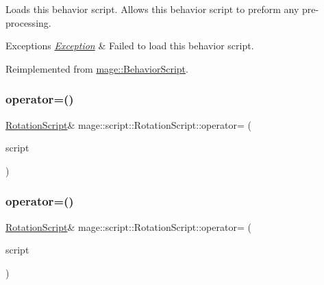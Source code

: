 Loads this behavior script. Allows this behavior script to preform any pre-\/processing.


\begin{DoxyExceptions}{Exceptions}
{\em \hyperlink{classmage_1_1_exception}{Exception}} & Failed to load this behavior script. \\
\hline
\end{DoxyExceptions}


Reimplemented from \hyperlink{classmage_1_1_behavior_script_a06521eef472f2d878a9f652b95b723a8}{mage\+::\+Behavior\+Script}.

\hypertarget{classmage_1_1script_1_1_rotation_script_afa4e9fcddf4f20f6c471dfd5fed1610f}{}\label{classmage_1_1script_1_1_rotation_script_afa4e9fcddf4f20f6c471dfd5fed1610f} 
\subsubsection{\texorpdfstring{operator=()}{operator=()}\hspace{0.1cm}{\footnotesize\ttfamily [1/2]}}
{\footnotesize\ttfamily \hyperlink{classmage_1_1script_1_1_rotation_script}{Rotation\+Script}\& mage\+::script\+::\+Rotation\+Script\+::operator= (\begin{DoxyParamCaption}\item[{const \hyperlink{classmage_1_1script_1_1_rotation_script}{Rotation\+Script} \&}]{script }\end{DoxyParamCaption})\hspace{0.3cm}{\ttfamily [delete]}}

\hypertarget{classmage_1_1script_1_1_rotation_script_a72642ac8b1f210ab4eb7feb67238a1bb}{}\label{classmage_1_1script_1_1_rotation_script_a72642ac8b1f210ab4eb7feb67238a1bb} 
\subsubsection{\texorpdfstring{operator=()}{operator=()}\hspace{0.1cm}{\footnotesize\ttfamily [2/2]}}
{\footnotesize\ttfamily \hyperlink{classmage_1_1script_1_1_rotation_script}{Rotation\+Script}\& mage\+::script\+::\+Rotation\+Script\+::operator= (\begin{DoxyParamCaption}\item[{\hyperlink{classmage_1_1script_1_1_rotation_script}{Rotation\+Script} \&\&}]{script }\end{DoxyParamCaption})\hspace{0.3cm}{\ttfamily [delete]}}

